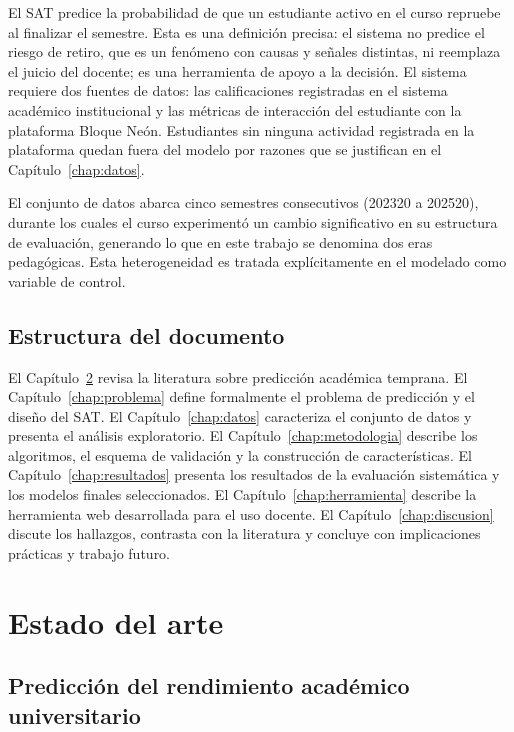 \documentclass[12pt, letterpaper, openany]{report}
\begin{document}
El SAT predice la probabilidad de que un estudiante activo en el curso repruebe al finalizar el semestre. Esta es una definición precisa: el sistema no predice el riesgo de retiro, que es un fenómeno con causas y señales distintas, ni reemplaza el juicio del docente; es una herramienta de apoyo a la decisión. El sistema requiere dos fuentes de datos: las calificaciones registradas en el sistema académico institucional y las métricas de interacción del estudiante con la plataforma Bloque Neón. Estudiantes sin ninguna actividad registrada en la plataforma quedan fuera del modelo por razones que se justifican en el Capítulo~\ref{chap:datos}.

El conjunto de datos abarca cinco semestres consecutivos (202320 a 202520), durante los cuales el curso experimentó un cambio significativo en su estructura de evaluación, generando lo que en este trabajo se denomina dos eras pedagógicas. Esta heterogeneidad es tratada explícitamente en el modelado como variable de control.

\section{Estructura del documento}

El Capítulo~\ref{chap:literatura} revisa la literatura sobre predicción académica temprana. El Capítulo~\ref{chap:problema} define formalmente el problema de predicción y el diseño del SAT. El Capítulo~\ref{chap:datos} caracteriza el conjunto de datos y presenta el análisis exploratorio. El Capítulo~\ref{chap:metodologia} describe los algoritmos, el esquema de validación y la construcción de características. El Capítulo~\ref{chap:resultados} presenta los resultados de la evaluación sistemática y los modelos finales seleccionados. El Capítulo~\ref{chap:herramienta} describe la herramienta web desarrollada para el uso docente. El Capítulo~\ref{chap:discusion} discute los hallazgos, contrasta con la literatura y concluye con implicaciones prácticas y trabajo futuro.

\chapter{Estado del arte}
\label{chap:literatura}

\section{Predicción del rendimiento académico universitario}
\end{document}
